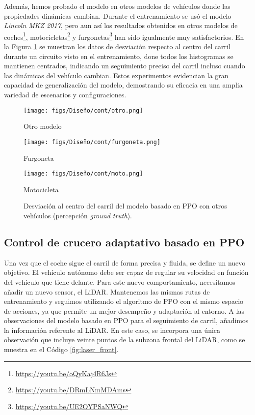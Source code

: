 Además, hemos probado el modelo en otros modelos de vehículos donde las propiedades dinámicas cambian. Durante el entrenamiento se usó el modelo \textit{Lincoln MKZ 2017}, pero aun así los resultados obtenidos en otros modelos de coches\footnote{\url{https://youtu.be/oQyKaj4R6Js}}, motocicletas\footnote{\url{https://youtu.be/DRmLNmMDAms}} y furgonetas\footnote{\url{https://youtu.be/UE2OYPSaNWQ}} han sido igualmente muy satisfactorios. En la Figura \ref{fig:ppo_carril_din} se muestran los datos de desviación respecto al centro del carril durante un circuito visto en el entrenamiento, done todos los histogramas se mantienen centrados, indicando un seguimiento preciso del carril incluso cuando las dinámicas del vehículo cambian. Estos experimentos evidencian la gran capacidad de generalización del modelo, demostrando su eficacia en una amplia variedad de escenarios y configuraciones.
\begin{figure}[ht]
\centering
\begin{minipage}{0.32\textwidth}
    \centering
    \texttt{[image: figs/Diseño/cont/otro.png]}
    \caption{Otro modelo}
\end{minipage}%
\begin{minipage}{0.32\textwidth}
    \centering
    \texttt{[image: figs/Diseño/cont/furgoneta.png]}
    \caption{Furgoneta}
\end{minipage}%
\begin{minipage}{0.32\textwidth}
    \centering
    \texttt{[image: figs/Diseño/cont/moto.png]}
    \caption{Motocicleta}
\end{minipage}
\caption{Desviación al centro del carril del modelo basado en \ac{PPO} con otros vehículos (percepción \textit{ground truth}).}
\label{fig:ppo_carril_din}
\end{figure}

\newpage

\subsection{Control de crucero adaptativo basado en \ac{PPO}}

Una vez que el coche sigue el carril de forma precisa y fluida, se define un nuevo objetivo. El vehículo autónomo debe ser capaz de regular su velocidad en función del vehículo que tiene delante. Para este nuevo comportamiento, necesitamos añadir un nuevo sensor, el \ac{LiDAR}. Mantenemos las mismas rutas de entrenamiento y seguimos utilizando el algoritmo de \ac{PPO} con el mismo espacio de acciones, ya que permite un mejor desempeño y adaptación al entorno. A las observaciones del modelo basado en \ac{PPO} para el seguimiento de carril, añadimos la información referente al \ac{LiDAR}. En este caso, se incorpora una única observación que incluye veinte puntos de la subzona frontal del \ac{LiDAR}, como se muestra en el Código \ref{fig:laser_front}.

